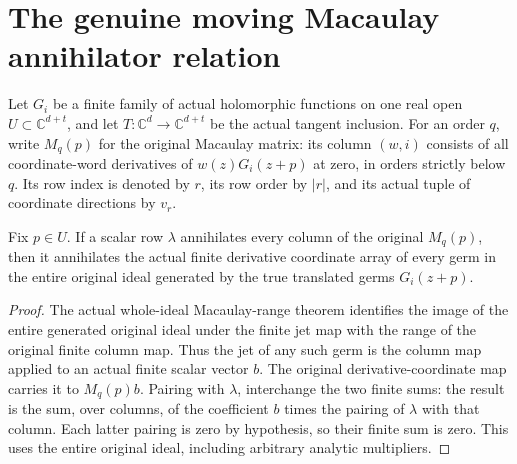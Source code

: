 \section{The genuine moving Macaulay annihilator relation}

Let $G_i$ be a finite family of actual holomorphic functions on one
real open $U\subset\mathbb C^{d+t}$, and let $T:\mathbb C^d\to
\mathbb C^{d+t}$ be the actual tangent inclusion. For an order $q$,
write $M_q(p)$ for the original Macaulay matrix: its column $(w,i)$
consists of all coordinate-word derivatives of $w(z)G_i(z+p)$ at zero,
in orders strictly below $q$. Its row index is denoted by $r$, its row
order by $|r|$, and its actual tuple of coordinate directions by $v_r$.

\begin{theorem}
\label{hir:actual-macaulay-annihilator-whole-ideal-jet}
\leanok
Fix $p\in U$. If a scalar row $\lambda$ annihilates every column of
the original $M_q(p)$, then it annihilates the actual finite derivative
coordinate array of every germ in the entire original ideal generated
by the true translated germs $G_i(z+p)$.
\end{theorem}
\begin{proof}
The actual whole-ideal Macaulay-range theorem identifies the image of
the entire generated original ideal under the finite jet map with the
range of the original finite column map. Thus the jet of any such
germ is the column map applied to an actual finite scalar vector $b$.
The original derivative-coordinate map carries it to $M_q(p)b$.
Pairing with $\lambda$, interchange the two finite sums: the result is
the sum, over columns, of the coefficient $b$ times the pairing of
$\lambda$ with that column. Each latter pairing is zero by hypothesis,
so their finite sum is zero. This uses the entire original ideal,
including arbitrary analytic multipliers.
\end{proof}

